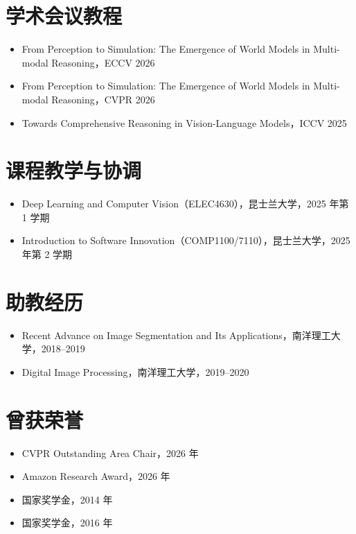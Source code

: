 \documentclass[UTF8,a4paper,11pt,fontset=fandol]{ctexart}
\newcommand{\rSection}[1]{\section*{#1}}
\begin{document}
\rSection{学术会议教程}
\begin{itemize}
\item From Perception to Simulation: The Emergence of World Models in Multi-modal Reasoning，ECCV 2026
\item From Perception to Simulation: The Emergence of World Models in Multi-modal Reasoning，CVPR 2026
\item Towards Comprehensive Reasoning in Vision-Language Models，ICCV 2025
\end{itemize}
\rSection{课程教学与协调}
\begin{itemize}
\item Deep Learning and Computer Vision（ELEC4630），昆士兰大学，2025 年第 1 学期
\item Introduction to Software Innovation（COMP1100/7110），昆士兰大学，2025 年第 2 学期
\end{itemize}
\rSection{助教经历}
\begin{itemize}
\item Recent Advance on Image Segmentation and Its Applications，南洋理工大学，2018–2019
\item Digital Image Processing，南洋理工大学，2019–2020
\end{itemize}
\rSection{曾获荣誉}
\begin{itemize}
\item CVPR Outstanding Area Chair，2026 年
\item Amazon Research Award，2026 年
\item 国家奖学金，2014 年
\item 国家奖学金，2016 年
\end{itemize}
\end{document}
